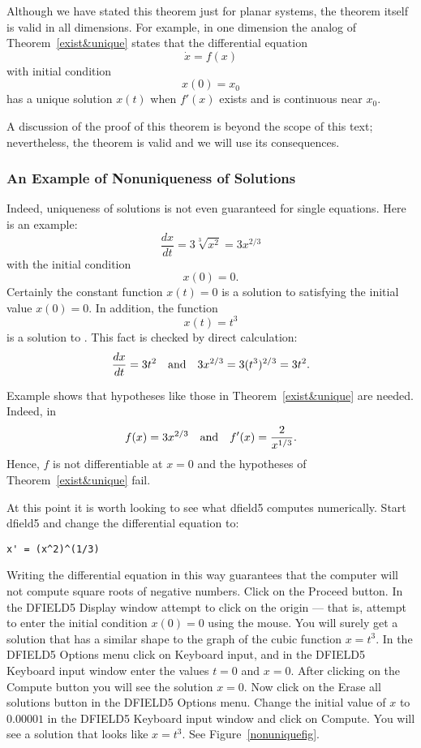 \documentclass{ximera}
\begin{document}
Although we have stated this theorem just for planar systems, the theorem
itself is valid in all dimensions.   For example, in one dimension the analog
of Theorem~\ref{exist&unique} states that the differential equation
\[
\dot{x} = f(x)
\]
with initial condition
\[
x(0)=x_0
\]
has a unique solution $x(t)$ when $f'(x)$ exists and is
continuous near $x_0$.

A discussion of the proof of this theorem is beyond the scope of this text;
nevertheless, the theorem is valid and we will use its consequences.

\subsubsection*{An Example of Nonuniqueness of Solutions}

Indeed, uniqueness of solutions is not even
guaranteed for single equations.  Here is an example:
\begin{equation}  \label{nonunique}
\frac{dx}{dt} = 3\sqrt[3]{x^2} = 3x^{2/3}
\end{equation}
with the initial condition
\[
x(0)=0.
\]
Certainly the constant function $x(t)=0$ is a solution to 
satisfying the initial value $x(0)=0$.  In addition, the function
\[
x(t) = t^3
\]
is a solution to .  This fact is checked by direct
calculation:
\[
\frac{dx}{dt} = 3t^2 \quad\mbox{and}\quad  3x^{2/3}= 3(t^3)^{2/3} = 3t^2.
\]

Example  shows that hypotheses like those in
Theorem~\ref{exist&unique} are needed.  Indeed, in 
\[
f(x)=3x^{2/3} \quad\mbox{and}\quad f'(x) = \frac{2}{x^{1/3}}.
\]
Hence, $f$ is not differentiable at $x=0$ and the hypotheses of
Theorem~\ref{exist&unique} fail.

At this point it is worth looking to see what {\sf dfield5}
computes numerically.  Start {\sf dfield5}  and
change the differential equation to:
\begin{verbatim}
x' = (x^2)^(1/3)
\end{verbatim}
Writing the differential equation in this way guarantees that
the computer will not compute square roots of negative numbers.
Click on the {\sf Proceed} button.  In the {\sf DFIELD5 Display}
window attempt to click on the origin --- that is, attempt to
enter the initial condition $x(0)=0$ using the mouse.  You will surely get
a solution that has a similar shape to the graph of the cubic function
$x=t^3$.  In the {\sf DFIELD5 Options} menu click on {\sf Keyboard input},
and in the {\sf DFIELD5 Keyboard input} window enter the
values $t=0$ and $x=0$.  After clicking on the {\sf Compute}
button you will see the solution $x=0$.  Now click on the {\sf
Erase all solutions} button in the {\sf DFIELD5 Options} menu.
Change the initial value of $x$ to $0.00001$ in the {\sf DFIELD5
Keyboard input} window and click on {\sf Compute}.  You will see
a solution that looks like $x=t^3$.  See Figure~\ref{nonuniquefig}.
\end{document}
